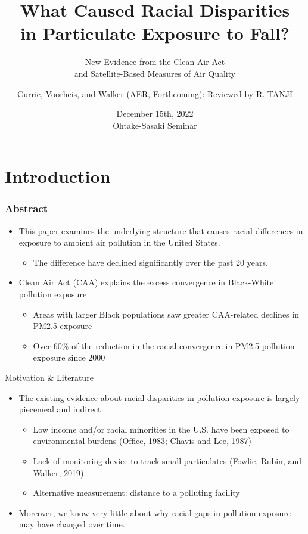 \documentclass[dvipdfmx,12pt]{beamer}
\title[Currie, Voorheis, and Walker, Forthcoming]{What Caused Racial Disparities \\ in Particulate Exposure to Fall?}
\subtitle{New Evidence from the Clean Air Act \\ and Satellite-Based Measures of Air Quality}
\author[R.Tanji]{Currie, Voorheis, and Walker (AER, Forthcoming): Reviewed by R. TANJI}
\date[12/15/2022 OS Semi.]{December 15th, 2022 \\ Ohtake-Sasaki Seminar}
\institute[]{Osaka University, Graduate School of Economics}
\begin{document}
\begin{frame}\frametitle{}
\titlepage
\end{frame}

\section{Introduction}

\begin{frame}\frametitle{Abstract}
  \begin{itemize}
    \item This paper examines the underlying structure that causes racial differences in exposure to ambient air pollution in the United States.
    \begin{itemize}
      \item The difference have declined significantly over the past 20 years.
    \end{itemize}
    \item Clean Air Act (CAA) explains the excess convergence in Black-White pollution exposure
    \begin{itemize}
      \item Areas with larger Black populations saw greater CAA-related declines in PM2.5 exposure
      \item Over 60\% of the reduction in the racial convergence in PM2.5 pollution exposure since 2000
    \end{itemize}
  \end{itemize}
\end{frame}

\frame{\tableofcontents}

\frame{\sectionpage}
\begin{frame}{Motivation \& Literature}
  \begin{itemize}
    \item The existing evidence about racial disparities in pollution exposure is largely piecemeal and indirect.
    \begin{itemize}
      \item Low income and/or racial minorities in the U.S. have been exposed to environmental burdens (Office, 1983; Chavis and Lee, 1987)
      \item Lack of monitoring device to track small particulates (Fowlie, Rubin, and Walker, 2019)
      \item Alternative measurement: distance to a polluting facility
    \end{itemize}
    \item Moreover, we know very little about why racial gaps in pollution exposure may have changed over time.
  \end{itemize}
\end{frame}
\end{document}
